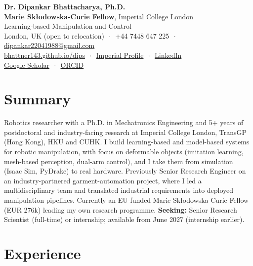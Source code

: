 \documentclass[10pt,a4paper]{article}
\begin{document}
\begin{center}
  {\LARGE\bfseries\sffamily\color{accent} Dr. Dipankar Bhattacharya, Ph.D.}\\[0.3em]
  {\bfseries Marie Sk\l{}odowska-Curie Fellow}, Imperial College London\\[0.15em]
  {\small Learning-based Manipulation and Control}\\[0.2em]
  {\small
  London, UK (open to relocation) $\,\cdot\,$ +44 7448 647 225 $\,\cdot\,$
  \href{mailto:dipankar22041988@gmail.com}{dipankar22041988@gmail.com}\\
  \href{https://bhattner143.github.io/dips/}{bhattner143.github.io/dips} $\,\cdot\,$
  \href{https://profiles.imperial.ac.uk/d.bhattacharya1/about}{Imperial Profile} $\,\cdot\,$
  \href{https://www.linkedin.com/in/dipankar-bhattacharya-phd-imperial}{LinkedIn}\\
  \href{https://scholar.google.com/citations?user=4BBRfsMAAAAJ\&hl=en}{Google Scholar} $\,\cdot\,$
  \href{https://orcid.org/0000-0002-4737-9818}{ORCID}}
\end{center}

\section*{Summary}
Robotics researcher with a Ph.D. in Mechatronics Engineering and 5+ years of postdoctoral and industry-facing
research at Imperial College London, TransGP (Hong Kong), HKU and CUHK. I build
learning-based and model-based systems for robotic manipulation, with focus on deformable objects
(imitation learning, mesh-based perception, dual-arm control), and I take them from simulation (Isaac Sim, PyDrake)
to real hardware. Previously Senior Research Engineer on an industry-partnered garment-automation project, where I
led a multidisciplinary team and translated industrial requirements into deployed manipulation pipelines.
Currently an EU-funded Marie Sk\l{}odowska-Curie Fellow (EUR 276k) leading my own research programme.
\textbf{Seeking:} Senior Research Scientist (full-time) or internship; available from June 2027 (internship earlier).

\section*{Experience}
\end{document}
